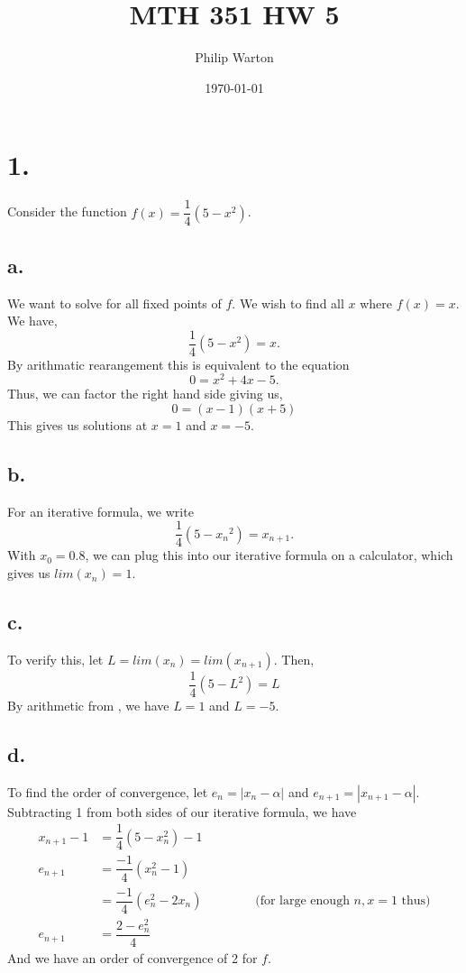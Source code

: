 \documentclass{article}
\begin{document}
\title{MTH 351 HW 5}
\author{Philip Warton}
\date{\today}
\maketitle

\section*{1.}
Consider the function $f(x) = \dfrac{1}{4}(5-x^2)$.
\subsection*{a.}
We want to solve for all fixed points of $f$. We wish to find all $x$ where $f(x) = x$. We have, \[ \dfrac{1}{4}(5-x^2) = x. \] By arithmatic rearangement this is equivalent to the equation \[ 0 = x^2 +4x -5. \] Thus, we can factor the right hand side giving us, \[ 0 = (x-1)(x+5) \] This gives us solutions at $x = 1$ and $x = -5$.
\subsection*{b.}
For an iterative formula, we write \[ \dfrac{1}{4}(5-{x_n}^2) = {x_{n+1}}. \] With $x_0 = 0.8$,  we can plug this into our iterative formula on a calculator, which gives us $lim(x_n) = 1$. 
\subsection*{c.}
To verify this, let $L = lim(x_n) = lim(x_{n+1})$. Then,
\[ \dfrac{1}{4}(5-{L}^2) = {L} \] By arithmetic from , we have $L = 1$ and $L = -5$.


\subsection*{d.}
To find the order of convergence, let $e_{n} = | x_n - \alpha |$ and $e_{n+1} = | x_{n+1} - \alpha |$. Subtracting 1 from both sides of our iterative formula, we have 
\begin{align*}
 x_{n+1} - 1 & = \dfrac{1}{4}(5-x_n^2) -1 \\
e_{n+1} & = \dfrac{-1}{4}(x_n^2-1) \\
& = \dfrac{-1}{4}(e_n^2 - 2x_n) \ \ \ \ \ \ \ \ \ \ \ \ \ \ \ \ \ \ \ \text{(for large enough $n, x = 1$ thus)}\\
e_{n+1}& = \dfrac{2-e_n^2}{4}
\end{align*}
And we have an order of convergence of 2 for $f$.
\end{document}
